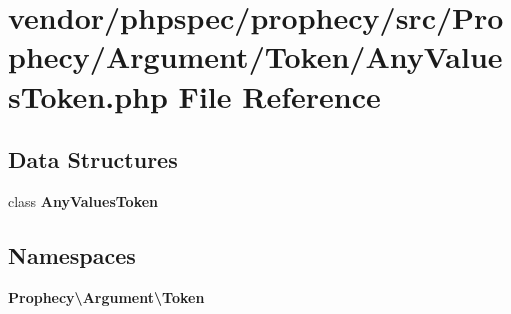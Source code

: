\section{vendor/phpspec/prophecy/src/\+Prophecy/\+Argument/\+Token/\+Any\+Values\+Token.php File Reference}
\label{_any_values_token_8php}
\subsection*{Data Structures}
\begin{DoxyCompactItemize}
\item 
class {\bf Any\+Values\+Token}
\end{DoxyCompactItemize}
\subsection*{Namespaces}
\begin{DoxyCompactItemize}
\item 
 {\bf Prophecy\textbackslash{}\+Argument\textbackslash{}\+Token}
\end{DoxyCompactItemize}
